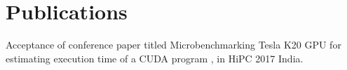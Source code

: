 \section{Publications}
\begin{itemize}[leftmargin=0.15in, label={}]
    \small{\item{Acceptance of conference paper titled Microbenchmarking Tesla K20 GPU for estimating execution time of a CUDA program , in HiPC 2017 India.}}
\end{itemize}


